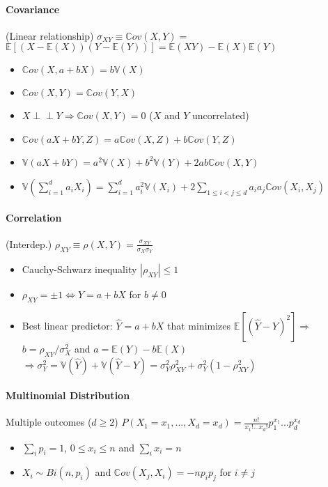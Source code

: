 \documentclass[paper=a4,fontsize=8pt,pagesize,DIV=calc]{scrartcl}
\newcounter{row}
\def\Perp{\perp\!\!\!\perp}
\begin{document}
\begin{multicols}{3}
\paragraph{Covariance} (Linear relationship) $\sigma_{XY}\equiv \mathbb{C}ov(X,Y)=$\\$\mathbb{E}[(X-\mathbb{E}(X))(Y-\mathbb{E}(Y))]=\mathbb{E}(XY)-\mathbb{E}(X)\mathbb{E}(Y)$
\begin{itemize}
\item $\mathbb{C}ov(X,a+bX)=b\mathbb{V}(X)$
\item $\mathbb{C}ov(X,Y)=\mathbb{C}ov(Y,X)$
\item $X \Perp Y \Rightarrow \mathbb{C}ov(X,Y)=0$ ($X$ and $Y$ uncorrelated)
\item $\mathbb{C}ov(aX+bY,Z)=a\mathbb{C}ov(X,Z)+b\mathbb{C}ov(Y,Z)$
\item $\mathbb{V}(aX+bY)=a^2\mathbb{V}(X)+b^2\mathbb{V}(Y)+2ab\mathbb{C}ov(X,Y)$
\item $\mathbb{V}(\sum^d_{i=1}a_iX_i)=\sum^d_{i=1}a_i^2\mathbb{V}(X_i)+2\sum_{1\leq i<j\leq d} a_ia_j\mathbb{C}ov(X_i,X_j)$
\end{itemize}
\paragraph{Correlation} (Interdep.) $\rho_{XY}\equiv \rho(X,Y)=\frac{\sigma_{XY}}{\sigma_X \sigma_Y}$
\begin{itemize}
\item Cauchy-Schwarz inequality $|\rho_{XY}|\leq 1$
\item $\rho_{XY}=\pm 1 \Leftrightarrow Y=a+bX$ for $b\neq 0$
\item Best linear predictor: $\hat{Y}=a+bX$ that minimizes $\mathbb{E}[(\hat{Y}-Y)^2] \Rightarrow$ $b=\rho_{XY}/\sigma_{X}^2$ and $a=\mathbb{E}(Y)-b\mathbb{E}(X)$ $\Rightarrow \sigma_Y^2=\mathbb{V}(\hat{Y})+\mathbb{V}(\hat{Y}-Y)=\sigma_Y^2\rho_{XY}^2+\sigma_Y^2(1-\rho_{XY}^2)$
\end{itemize}
\paragraph{Multinomial Distribution} Multiple outcomes ($d\geq 2$)
$P(X_1=x_1,...,X_d=x_d)=\frac{n!}{x_1!...x_d!}p_1^{x_1}...p_d^{x_d}$
\begin{itemize}
\item $\sum_i p_i=1$, $0\leq x_i\leq n$ and $\sum_i x_i=n$ 
\item $X_i \sim Bi(n,p_i)$ and $\mathbb{C}ov(X_j,X_i)=-np_ip_j$ for $i\neq j$
\end{itemize}

\end{multicols}
\end{document}
